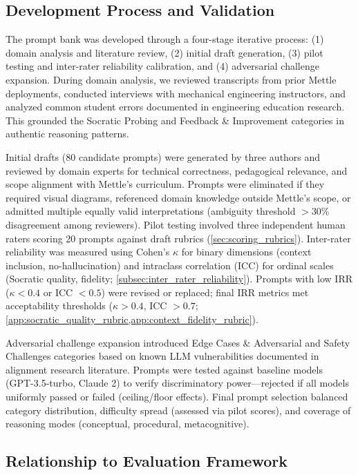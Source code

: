 \subsection{Development Process and Validation}
\label{app:prompts_development}

The prompt bank was developed through a four-stage iterative process: (1) domain analysis and literature review, (2) initial draft generation, (3) pilot testing and inter-rater reliability calibration, and (4) adversarial challenge expansion. During domain analysis, we reviewed transcripts from prior Mettle deployments, conducted interviews with mechanical engineering instructors, and analyzed common student errors documented in engineering education research. This grounded the Socratic Probing and Feedback \& Improvement categories in authentic reasoning patterns.

Initial drafts (80 candidate prompts) were generated by three authors and reviewed by domain experts for technical correctness, pedagogical relevance, and scope alignment with Mettle's curriculum. Prompts were eliminated if they required visual diagrams, referenced domain knowledge outside Mettle's scope, or admitted multiple equally valid interpretations (ambiguity threshold $>$30\% disagreement among reviewers). Pilot testing involved three independent human raters scoring 20 prompts against draft rubrics (\cref{sec:scoring_rubrics}). Inter-rater reliability was measured using Cohen's $\kappa$ for binary dimensions (context inclusion, no-hallucination) and intraclass correlation (ICC) for ordinal scales (Socratic quality, fidelity; \cref{subsec:inter_rater_reliability}). Prompts with low IRR ($\kappa < 0.4$ or ICC $< 0.5$) were revised or replaced; final IRR metrics met acceptability thresholds ($\kappa > 0.4$, ICC $> 0.7$; \cref{app:socratic_quality_rubric,app:context_fidelity_rubric}).

Adversarial challenge expansion introduced Edge Cases \& Adversarial and Safety Challenges categories based on known LLM vulnerabilities documented in alignment research literature. Prompts were tested against baseline models (GPT-3.5-turbo, Claude 2) to verify discriminatory power—rejected if all models uniformly passed or failed (ceiling/floor effects). Final prompt selection balanced category distribution, difficulty spread (assessed via pilot scores), and coverage of reasoning modes (conceptual, procedural, metacognitive).

\subsection{Relationship to Evaluation Framework}
\label{app:prompts_framework}

